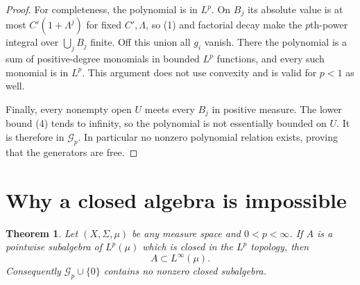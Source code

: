\documentclass[11pt]{article}
\newtheorem{theorem}{Theorem}
\newcommand{\cG}{\mathcal G}
\begin{document}
\begin{proof}
For completeness, the polynomial is in $L^p$.  On $B_j$ its absolute value
is at most $C'(1+\Lambda^j)$ for fixed $C',\Lambda$, so (1) and factorial
decay make the $p$th-power integral over $\bigcup_jB_j$ finite.  Off this
union all $g_i$ vanish.  There the polynomial is a sum of positive-degree
monomials in bounded $L^p$ functions, and every such monomial is in $L^p$.
This argument does not use convexity and is valid for $p<1$ as well.

Finally, every nonempty open $U$ meets every $B_j$ in positive measure.  The
lower bound (4) tends to infinity, so the polynomial is not essentially
bounded on $U$.  It is therefore in $\cG_p$.  In particular no nonzero
polynomial relation exists, proving that the generators are free.
\end{proof}

\section{Why a closed algebra is impossible}

\begin{theorem}\label{thm:closed}
Let $(X,\Sigma,\mu)$ be any measure space and $0<p<\infty$.  If $A$ is a
pointwise subalgebra of $L^p(\mu)$ which is closed in the $L^p$ topology, then
\[
  A\subset L^\infty(\mu).
\]
Consequently $\cG_p\cup\{0\}$ contains no nonzero closed subalgebra.
\end{theorem}
\end{document}

